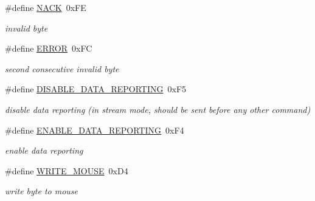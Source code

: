 \begin{DoxyCompactItemize}
\mbox{\label{group__mouse__macros_ga958518a45b12053ae33606ee7cb68a55}} 
\#define \hyperlink{group__mouse__macros_ga958518a45b12053ae33606ee7cb68a55}{N\+A\+CK}~0x\+FE
\begin{DoxyCompactList}\small\item\em invalid byte \end{DoxyCompactList}\item 
\mbox{\label{group__mouse__macros_ga8fe83ac76edc595f6b98cd4a4127aed5}} 
\#define \hyperlink{group__mouse__macros_ga8fe83ac76edc595f6b98cd4a4127aed5}{E\+R\+R\+OR}~0x\+FC
\begin{DoxyCompactList}\small\item\em second consecutive invalid byte \end{DoxyCompactList}\item 
\mbox{\label{group__mouse__macros_ga8e51dfaa390f8cfb4b1b286fb3b22aff}} 
\#define \hyperlink{group__mouse__macros_ga8e51dfaa390f8cfb4b1b286fb3b22aff}{D\+I\+S\+A\+B\+L\+E\+\_\+\+D\+A\+T\+A\+\_\+\+R\+E\+P\+O\+R\+T\+I\+NG}~0x\+F5
\begin{DoxyCompactList}\small\item\em disable data reporting (in stream mode, should be sent before any other command) \end{DoxyCompactList}\item 
\mbox{\label{group__mouse__macros_ga9c64a38cca5c7aabe0ab2d8c5e21e723}} 
\#define \hyperlink{group__mouse__macros_ga9c64a38cca5c7aabe0ab2d8c5e21e723}{E\+N\+A\+B\+L\+E\+\_\+\+D\+A\+T\+A\+\_\+\+R\+E\+P\+O\+R\+T\+I\+NG}~0x\+F4
\begin{DoxyCompactList}\small\item\em enable data reporting \end{DoxyCompactList}\item 
\mbox{\label{group__mouse__macros_ga5ca1baba7129f2acebcc07cbbbde8736}} 
\#define \hyperlink{group__mouse__macros_ga5ca1baba7129f2acebcc07cbbbde8736}{W\+R\+I\+T\+E\+\_\+\+M\+O\+U\+SE}~0x\+D4
\begin{DoxyCompactList}\small\item\em write byte to mouse \end{DoxyCompactList}\item 

\end{DoxyCompactItemize}
